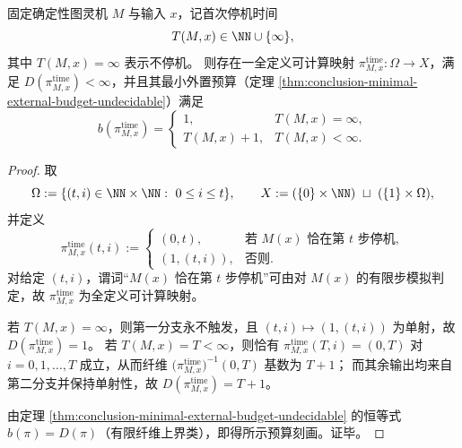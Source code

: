 \begin{theorem}\label{thm:conclusion-halting-time-external-budget-exact}
固定确定性图灵机 \(M\) 与输入 \(x\)，记首次停机时间
\[
T(M,x)\in\NN\cup\{\infty\},
\]
其中 \(T(M,x)=\infty\) 表示不停机。
则存在一全定义可计算映射 \(\pi^{\mathrm{time}}_{M,x}:\Omega\to X\)，满足 \(D(\pi^{\mathrm{time}}_{M,x})<\infty\)，并且其最小外置预算（定理 \ref{thm:conclusion-minimal-external-budget-undecidable}）满足
\[
b\!\left(\pi^{\mathrm{time}}_{M,x}\right)=
\begin{cases}
1,& T(M,x)=\infty,\\[2pt]
T(M,x)+1,& T(M,x)<\infty.
\end{cases}
\]
\end{theorem}
\begin{proof}
取
\[
\Omega:=\{(t,i)\in\NN\times\NN:\ 0\le i\le t\},
\qquad
X:=(\{0\}\times\NN)\ \sqcup\ (\{1\}\times\Omega),
\]
并定义
\[
\pi^{\mathrm{time}}_{M,x}(t,i):=
\begin{cases}
(0,t),& \text{若 \(M(x)\) 恰在第 \(t\) 步停机},\\
(1,(t,i)),& \text{否则}.
\end{cases}
\]
对给定 \((t,i)\)，谓词“\(M(x)\) 恰在第 \(t\) 步停机”可由对 \(M(x)\) 的有限步模拟判定，故 \(\pi^{\mathrm{time}}_{M,x}\) 为全定义可计算映射。
\par
若 \(T(M,x)=\infty\)，则第一分支永不触发，且 \((t,i)\mapsto (1,(t,i))\) 为单射，故 \(D(\pi^{\mathrm{time}}_{M,x})=1\)。
若 \(T(M,x)=T<\infty\)，则恰有
\(
\pi^{\mathrm{time}}_{M,x}(T,i)=(0,T)
\)
对 \(i=0,1,\dots,T\) 成立，从而纤维 \(\bigl(\pi^{\mathrm{time}}_{M,x}\bigr)^{-1}(0,T)\) 基数为 \(T+1\)；
而其余输出均来自第二分支并保持单射性，故 \(D(\pi^{\mathrm{time}}_{M,x})=T+1\)。
\par
由定理 \ref{thm:conclusion-minimal-external-budget-undecidable} 的恒等式 \(b(\pi)=D(\pi)\)（有限纤维上界类），即得所示预算刻画。证毕。
\end{proof}

